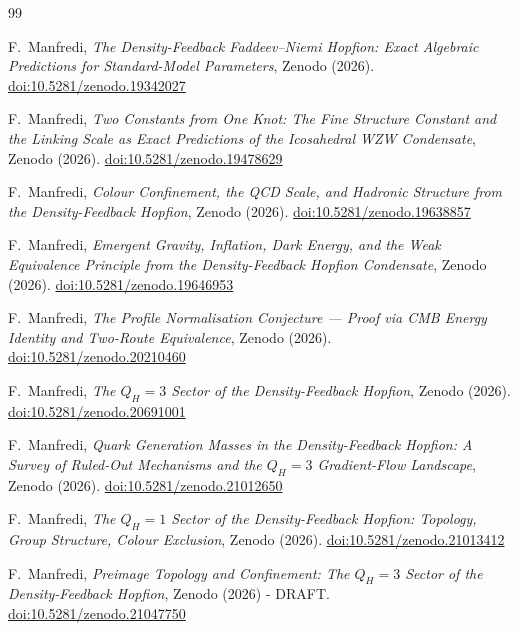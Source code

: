 \documentclass[11pt,a4paper]{article}
\theoremstyle{definition}\newtheorem{definition}[theorem]{Definition}
\theoremstyle{remark}
\begin{document}
\begin{thebibliography}{99}

F.~Manfredi,
\textit{The Density-Feedback Faddeev--Niemi Hopfion:
  Exact Algebraic Predictions for Standard-Model Parameters},
Zenodo (2026).
\href{https://doi.org/10.5281/zenodo.19342027}{doi:10.5281/zenodo.19342027}

F.~Manfredi,
\textit{Two Constants from One Knot: The Fine Structure Constant and
  the Linking Scale as Exact Predictions of the Icosahedral WZW Condensate},
Zenodo (2026).
\href{https://doi.org/10.5281/zenodo.19478629}{doi:10.5281/zenodo.19478629}

F.~Manfredi,
\textit{Colour Confinement, the QCD Scale, and Hadronic Structure
  from the Density-Feedback Hopfion},
Zenodo (2026).
\href{https://doi.org/10.5281/zenodo.19638857}{doi:10.5281/zenodo.19638857}

F.~Manfredi,
\textit{Emergent Gravity, Inflation, Dark Energy, and the Weak
  Equivalence Principle from the Density-Feedback Hopfion Condensate},
Zenodo (2026).
\href{https://doi.org/10.5281/zenodo.19646953}{doi:10.5281/zenodo.19646953}

F.~Manfredi,
\textit{The Profile Normalisation Conjecture ---
  Proof via CMB Energy Identity and Two-Route Equivalence},
Zenodo (2026).
\href{https://doi.org/10.5281/zenodo.20210460}{doi:10.5281/zenodo.20210460}

F.~Manfredi,
\textit{The $Q_H=3$ Sector of the Density-Feedback Hopfion},
Zenodo (2026).
\href{https://doi.org/10.5281/zenodo.20691001}{doi:10.5281/zenodo.20691001}

F.~Manfredi,
\textit{Quark Generation Masses in the Density-Feedback Hopfion:
A Survey of Ruled-Out Mechanisms and the $Q_H=3$ Gradient-Flow Landscape},
Zenodo (2026).
\href{https://doi.org/10.5281/zenodo.21012650}{doi:10.5281/zenodo.21012650}

F.~Manfredi,
\textit{The $Q_H=1$ Sector of the Density-Feedback Hopfion:
Topology, Group Structure, Colour Exclusion},
Zenodo (2026).
\href{https://doi.org/10.5281/zenodo.21013412}{doi:10.5281/zenodo.21013412}

F.~Manfredi,
\textit{Preimage Topology and Confinement: The $Q_H=3$ Sector of the Density-Feedback Hopfion},
Zenodo (2026) - DRAFT.
\href{https://doi.org/10.5281/zenodo.21047750}{doi:10.5281/zenodo.21047750}


\end{thebibliography}
\end{document}
